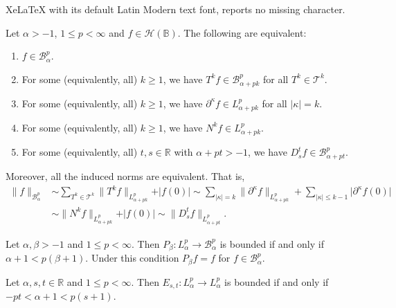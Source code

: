 \documentclass[10pt,a4paper]{amsart}
\begin{document}
XeLaTeX with its default Latin Modern text font, reports no missing character.
\begin{theorem}\label{TBergman}
Let $\alpha>-1$, $1\le p<\infty$ and $f\in\mathcal H(\mathbb B)$.
The following are equivalent:
\begin{enumerate}
  \item[(a)] $f\in \mathcal B^p_\alpha$.
  \item[(b)] For some (equivalently, all) $k\ge 1$, we have
  $T^k f\in \mathcal B^p_{\alpha+pk}$ for all $T^k\in\mathcal T^k$.
  \item[(c)] For some (equivalently, all) $k\ge 1$, we have
  $\partial^\kappa f\in L^p_{\alpha+pk}$ for all
  $\vert\kappa\vert=k$.
  \item[(d)] For some (equivalently, all) $k\ge 1$, we have
  $N^k f\in L^p_{\alpha+pk}$.
  \item[(e)] For some (equivalently, all) $t,s\in\mathbb R$ with $\alpha+pt>-1$,
  we have $D^t_s f\in \mathcal B^p_{\alpha+pt}$.
\end{enumerate}
Moreover, all the induced norms are equivalent.
That is,
\begin{align*}
\|f\|_{\mathcal B^p_\alpha}
&\sim \sum_{T^k\in\mathcal T^k} \|T^k f\|_{L^p_{\alpha+pk}}+\vert f(0)\vert
\sim \sum_{\vert\kappa\vert=k} \|\partial^\kappa f\|_{L^p_{\alpha+pk}}
     +\sum_{\vert\kappa\vert\le k-1} \vert\partial^\kappa f(0)\vert\\
&\sim \|N^k f\|_{L^p_{\alpha+pk}}+\vert f(0)\vert
\sim \|D^t_s f\|_{L^p_{\alpha+pt}}.
\end{align*}
\end{theorem}

\begin{othertheorem}\label{TProjBergman}
Let $\alpha,\beta>-1$ and $1\le p<\infty$.
Then $P_\beta\colon L^p_\alpha\to\mathcal B^p_\alpha$ is bounded if and
only if $\alpha+1<p(\beta+1)$.
Under this condition $P_\beta f=f$ for $f\in\mathcal B^p_\alpha$.
\end{othertheorem}

\begin{lemma}\label{LEbdd}
Let $\alpha,s,t\in\mathbb R$ and $1\le p<\infty$.
Then $E_{s,t}\colon L^p_\alpha\to L^p_\alpha$ is bounded
if and only if $-pt<\alpha+1<p(s+1)$.
\end{lemma}
\end{document}
